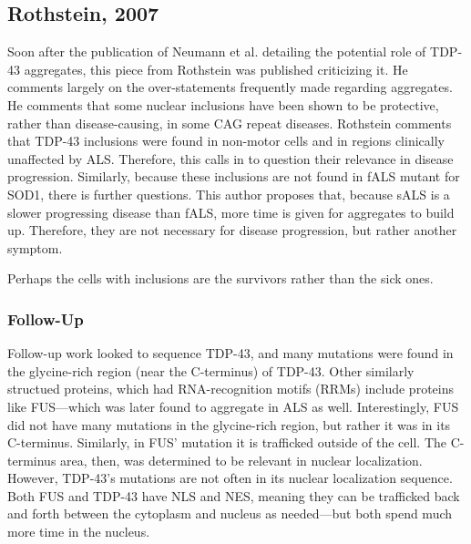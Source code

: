 \documentclass[12pt]{report}
\begin{document}
\subsection{Rothstein, 2007}

Soon after the publication of Neumann et al. detailing the potential role of TDP-43 aggregates, this piece from Rothstein was published criticizing it. He comments largely on the over-statements frequently made regarding aggregates. He comments that some nuclear inclusions have been shown to be protective, rather than disease-causing, in some CAG repeat diseases. Rothstein comments that TDP-43 inclusions were found in non-motor cells and in regions clinically unaffected by ALS. Therefore, this calls in to question their relevance in disease progression. Similarly, because these inclusions are not found in fALS mutant for SOD1, there is further questions. This author proposes that, because sALS is a slower progressing disease than fALS, more time is given for aggregates to build up. Therefore, they are not necessary for disease progression, but rather another symptom.\newline

Perhaps the cells with inclusions are the survivors rather than the sick ones. 

\subsubsection{Follow-Up}

Follow-up work looked to sequence TDP-43, and many mutations were found in the glycine-rich region (near the C-terminus) of TDP-43. Other similarly structued proteins, which had RNA-recognition motifs (RRMs) include proteins like FUS---which was later found to aggregate in ALS as well. Interestingly, FUS did not have many mutations in the glycine-rich region, but rather it was in its C-terminus. Similarly, in FUS' mutation it is trafficked outside of the cell. The C-terminus area, then, was determined to be relevant in nuclear localization. However, TDP-43's mutations are not often in its nuclear localization sequence. Both FUS and TDP-43 have NLS and NES, meaning they can be trafficked back and forth between the cytoplasm and nucleus as needed---but both spend much more time in the nucleus.\newline
\end{document}
